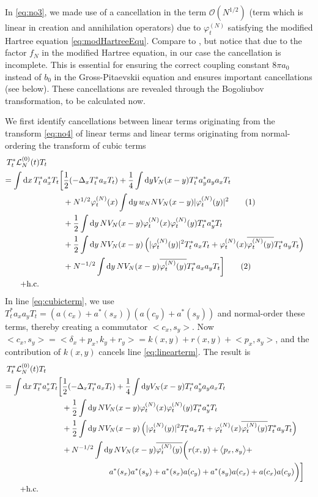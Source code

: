 \documentclass[11pt,a4paper,draft,DIV11]{scrartcl}	%
\newcommand{\di}{\textrm{d}}		%
\newcommand{\Lcal}{\mathcal{L}}		%
\newcommand{\Ocal}{\mathcal{O}}		%
\newcommand{\hc}{\mbox{h.c.}}		%
\newcommand{\scal}[2]{\big<#1,#2\big>} %
\newcommand{\cc}[1]{\overline{#1}}	%
\newcommand{\ph}{\varphi_t^{(N)}}	%
\newcommand{\bd}{\begin{displaymath}}			%
\newcommand{\ed}{\end{displaymath}}
\newcommand{\tagg}[1]{ \stepcounter{equation} \tag{\theequation} \label{eq:#1} } %
\newcommand{\eqr}[1]{\eqref{eq:#1}}			%
\begin{document}
In \eqr{no3}, we made use of a cancellation in the term $\Ocal({N^{1/2}})$
(term which is linear in creation and annihilation operators) due to $\ph$ satisfying the modified Hartree equation \eqr{modHartreeEqu}.
Compare to \cite{RS2009}, but notice that due to the factor $f_N$ in the modified Hartree equation, in our case the cancellation is incomplete. This is essential for ensuring the correct coupling constant $8\pi a_0$ instead of $b_0$ in the Gross-Pitaevskii equation and ensures important cancellations (see below). These cancellations are revealed through the Bogoliubov transformation, to be calculated now.

We first identify cancellations between linear terms originating from the transform \eqr{no4} of linear terms and linear terms originating from normal-ordering the transform of cubic terms
\begin{align*}
T^*_t \Lcal^{(0)}_N(t) T_t \qquad \\
= \int \di x\, T^*_t a^*_x T_t \bigg[ &   \frac{1}{2}(-\Delta_x T^*_t a_x T_t)  + \frac{1}{4}\int \di y V_N(x-y) T^*_t a^*_y a_y a_x T_t \\
& + N^{1/2} \ph(x) \int \di y\, w_N N V_N(x-y) \lvert \ph(y) \rvert^2 \tagg{linearterm} \\
& + \frac{1}{2} \int \di y\, NV_N(x-y)  \ph(x) \ph(y)  T^*_t a^*_y T_t \\
& + \frac{1}{2} \int \di y\, NV_N(x-y) \left(  \lvert \ph(y)\rvert^2 T^*_t a_x T_t + \ph(x) \cc{\ph(y)} T^*_t a_y T_t  \right) \\
& + N^{-1/2} \int \di y\, NV_N(x-y) \cc{\ph(y)} T^*_t a_x a_y T_t  \bigg]\tagg{cubicterm} \\
+ \hc \qquad \quad
\end{align*}
In line \eqr{cubicterm}, we use $T^\ast_t a_x a_y T_t = \left( a(c_x)+a^\ast (s_x) \right)\left( a(c_y) + a^\ast(s_y) \right)$ and normal-order these terms, thereby creating a commutator $\scal{c_x}{s_y}$. Now $\scal{c_x}{s_y} = \scal{\delta_x + p_x}{k_y + r_y} = k(x,y) + r(x,y) + \scal{p_x}{s_y}$, and the contribution of $k(x,y)$ cancels line \eqr{linearterm}. The result is
\begin{align*}
T^*_t \Lcal^{(0)}_N(t) T_t \qquad \\
= \int \di x\, T^*_t a^*_x T_t \bigg[ &   \frac{1}{2}(-\Delta_x T^*_t a_x T_t)  + \frac{1}{4}\int \di y V_N(x-y) T^*_t a^*_y a_y a_x T_t \\
& + \frac{1}{2} \int \di y\, NV_N(x-y)  \ph(x) \ph(y)  T^*_t a^*_y T_t \\
& + \frac{1}{2} \int \di y\, NV_N(x-y) \left(  \lvert \ph(y)\rvert^2 T^*_t a_x T_t + \ph(x) \cc{\ph(y)} T^*_t a_y T_t  \right) \\
& + N^{-1/2} \int \di y\, NV_N(x-y) \cc{\ph(y)} \bigg( r(x,y) + \scal{p_x}{s_y} + \\
& \qquad \qquad \hspace{0.7cm}   a^*(s_x) a^*(s_y) + a^*(s_x) a(c_y)  + a^*(s_y) a(c_x) + a(c_x) a(c_y)  \bigg)  \bigg] \\
+ \hc \qquad \quad
\end{align*}
\end{document}
